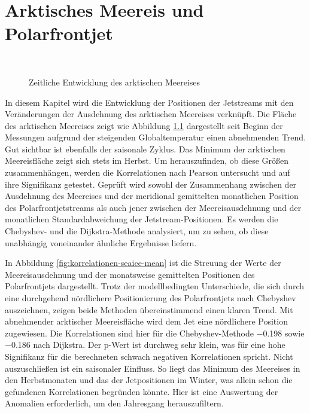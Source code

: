 \chapter{Arktisches Meereis und Polarfrontjet} \label{ch:seeeis}

\begin{figure} %
  \centering
  \begin{minipage}{\textwidth}
    \centering
  \end{minipage} \\ 
  \caption{Zeitliche Entwicklung des arktischen Meereises} \label{fig:seaice}
\end{figure}

In diesem Kapitel wird die Entwicklung der Positionen der Jetstreams mit den Veränderungen der Ausdehnung des arktischen Meereises verknüpft. Die Fläche des arktischen Meereises zeigt wie Abbildung \ref{fig:seaice} dargestellt seit Beginn der Messungen aufgrund der steigenden Globaltemperatur einen abnehmenden Trend. Gut sichtbar ist ebenfalls der saisonale Zyklus. Das Minimum der arktischen Meereisfläche zeigt sich stets im Herbst. Um herauszufinden, ob diese Größen zusammenhängen, werden die Korrelationen nach Pearson untersucht und auf ihre Signifikanz getestet. Geprüft wird sowohl der Zusammenhang zwischen der Ausdehnung des Meereises und der meridional gemittelten monatlichen Position des Polarfrontjetstreams als auch jener zwischen der Meereisausdehnung und der monatlichen Standardabweichung der Jetstream-Positionen. Es werden die Chebyshev- und die Dijkstra-Methode analysiert, um zu sehen, ob diese unabhängig voneinander ähnliche Ergebnisse liefern.

In Abbildung \ref{fig:korrelationen-seaice-mean} ist die Streuung der Werte der Meereisausdehnung und der monatsweise gemittelten Positionen des Polarfrontjets dargestellt. Trotz der modellbedingten Unterschiede, die sich durch eine durchgehend nördlichere Positionierung des Polarfrontjets nach Chebyshev auszeichnen, zeigen beide Methoden übereinstimmend einen klaren Trend. Mit abnehmender arktischer Meereisfläche wird dem Jet eine nördlichere Position zugewiesen. Die Korrelationen sind hier für die Chebyshev-Methode \num{-0.198} sowie \num{-0.186} nach Dijkstra. Der p-Wert ist durchweg sehr klein, was für eine hohe Signifikanz für die berechneten schwach negativen Korrelationen spricht. Nicht auszuschließen ist ein saisonaler Einfluss. So liegt das Minimum des Meereises in den Herbstmonaten und das der Jetpositionen im Winter, was allein schon die gefundenen Korrelationen begründen könnte. Hier ist eine Auswertung der Anomalien erforderlich, um den Jahresgang herauszufiltern.


